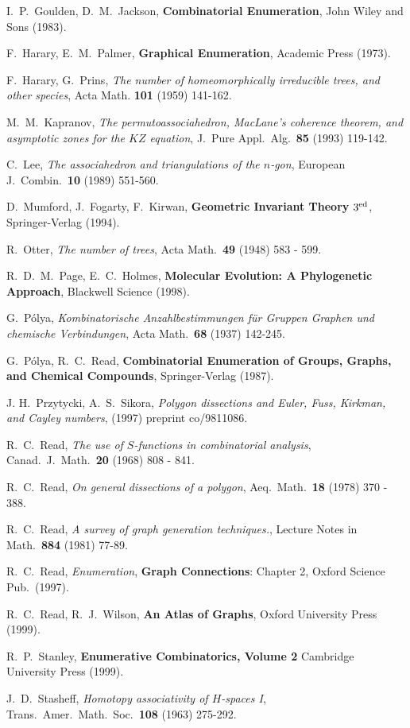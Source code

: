 \documentclass[10pt]{amsart}
\begin{document}
\begin{thebibliography}{ADM9}
 I.\ P.\ Goulden, D.\ M.\ Jackson, {\bf Combinatorial Enumeration}, John Wiley and Sons (1983).

 F.\ Harary, E.\ M.\ Palmer, {\bf Graphical Enumeration}, Academic Press (1973).

 F.\ Harary, G.\ Prins, {\em The number of homeomorphically irreducible trees, and other species}, Acta Math. {\bf 101} (1959) 141-162.

 M.\ M.\ Kapranov, {\em The permutoassociahedron, MacLane's coherence theorem, and asymptotic zones for the $KZ$ equation}, J.\ Pure Appl.\ Alg.\ {\bf 85} (1993) 119-142.

 C.\ Lee, {\em The associahedron and triangulations of the $n$-gon}, European J.\ Combin.\ {\bf 10} (1989) 551-560.

 D.\ Mumford, J.\ Fogarty, F.\ Kirwan, {\bf Geometric Invariant Theory} $3^{\rm ed}$, Springer-Verlag (1994).

 R.\ Otter, {\em The number of trees}, Acta Math.\ {\bf 49} (1948) 583 - 599.

 R.\ D.\ M.\ Page, E.\ C.\ Holmes, {\bf Molecular Evolution: A Phylogenetic Approach}, Blackwell Science (1998).

 G.\ P\'{o}lya, {\em Kombinatorische Anzahlbestimmungen f\"{u}r Gruppen Graphen und chemische Verbindungen}, Acta Math.\ {\bf 68} (1937) 142-245.

 G.\ P\'{o}lya, R.\ C.\ Read, {\bf Combinatorial Enumeration of Groups, Graphs, and Chemical Compounds}, Springer-Verlag (1987).

 J. H.\ Przytycki, A.\ S.\ Sikora, {\em Polygon dissections and Euler, Fuss, Kirkman, and Cayley numbers}, (1997) preprint co/9811086.

 R.\ C.\ Read, {\em The use of $S$-functions in combinatorial analysis}, Canad.\ J.\ Math.\ {\bf 20} (1968) 808 - 841.

 R.\ C.\ Read, {\em On general dissections of a polygon}, Aeq.\ Math.\ {\bf 18} (1978) 370 - 388.

 R.\ C.\ Read, {\em A survey of graph generation techniques.}, Lecture Notes in Math.\ {\bf 884} (1981) 77-89.

 R.\ C.\ Read, {\em Enumeration}, \textbf{Graph Connections}: Chapter 2, Oxford Science Pub.\ (1997).

 R.\ C.\ Read, R.\ J.\ Wilson, {\bf An Atlas of Graphs}, Oxford University Press (1999).

 R.\ P.\ Stanley, {\bf Enumerative Combinatorics, Volume 2} Cambridge University Press (1999).

 J.\ D.\ Stasheff, {\em Homotopy associativity of $H$-spaces I}, Trans.\ Amer.\ Math.\ Soc.\ {\bf 108} (1963) 275-292.

\end{thebibliography}
\end{document}
